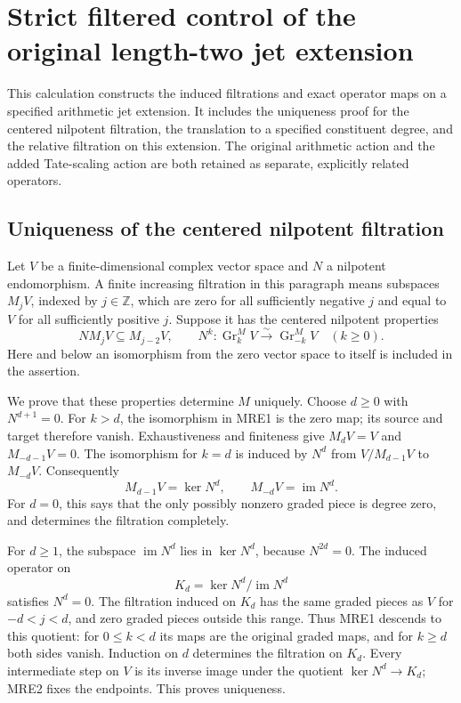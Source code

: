 \section{Strict filtered control of the original length-two jet extension}
\label{sec:tau-mixed-relative-extension-control}

This calculation constructs the induced filtrations and exact operator maps
on a specified arithmetic jet extension. It includes the uniqueness proof
for the centered nilpotent filtration, the translation to a specified
constituent degree, and the relative filtration on this extension.
The original arithmetic action and the added Tate-scaling action are both
retained as separate, explicitly related operators.

\subsection{Uniqueness of the centered nilpotent filtration}

Let \(V\) be a finite-dimensional complex vector space and \(N\) a nilpotent
endomorphism. A finite increasing filtration in this paragraph means
subspaces \(M_jV\), indexed by \(j\in\mathbb Z\), which are zero for all
sufficiently negative \(j\) and equal to \(V\) for all sufficiently positive
\(j\). Suppose it has the centered nilpotent properties
\[
 NM_jV\subseteq M_{j-2}V,\qquad
 N^k:\operatorname{Gr}_k^M V\xrightarrow{\sim}
                    \operatorname{Gr}_{-k}^M V\quad(k\geq0).
 \tag{MRE1}
\]
Here and below an isomorphism from the zero vector space to itself is
included in the assertion.

We prove that these properties determine \(M\) uniquely. Choose \(d\geq0\)
with \(N^{d+1}=0\). For \(k>d\), the isomorphism in MRE1 is the zero map;
its source and target therefore vanish. Exhaustiveness and finiteness give
\(M_dV=V\) and \(M_{-d-1}V=0\). The isomorphism for \(k=d\) is induced by
\(N^d\) from \(V/M_{d-1}V\) to \(M_{-d}V\). Consequently
\[
 M_{d-1}V=\ker N^d,\qquad M_{-d}V=\operatorname{im}N^d.
 \tag{MRE2}
\]
For \(d=0\), this says that the only possibly nonzero graded piece is
degree zero, and determines the filtration completely.

For \(d\geq1\), the subspace \(\operatorname{im}N^d\) lies in
\(\ker N^d\), because \(N^{2d}=0\). The induced operator on
\[
 K_d=\ker N^d/\operatorname{im}N^d
 \tag{MRE3}
\]
satisfies \(N^d=0\). The filtration induced on \(K_d\) has the same graded
pieces as \(V\) for \(-d<j<d\), and zero graded pieces outside this range.
Thus MRE1 descends to this quotient: for \(0\leq k<d\) its maps are the
original graded maps, and for \(k\geq d\) both sides vanish. Induction on
\(d\) determines the filtration on \(K_d\). Every intermediate step on
\(V\) is its inverse image under the quotient
\(\ker N^d\longrightarrow K_d\); MRE2 fixes the endpoints. This proves
uniqueness.

